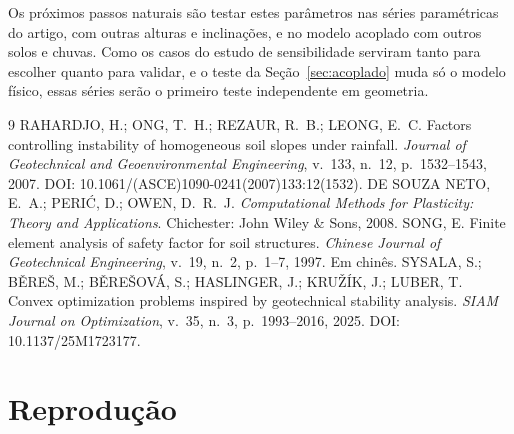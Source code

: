 \documentclass[11pt,a4paper]{article}
\numberwithin{equation}{section}
\begin{document}
Os próximos passos naturais são testar estes parâmetros nas séries paramétricas do artigo, com outras alturas e inclinações, e no modelo acoplado com outros solos e chuvas. Como os casos do estudo de sensibilidade serviram tanto para escolher quanto para validar, e o teste da Seção~\ref{sec:acoplado} muda só o modelo físico, essas séries serão o primeiro teste independente em geometria.


\begin{thebibliography}{9}
 RAHARDJO, H.; ONG, T.~H.; REZAUR, R.~B.; LEONG, E.~C. Factors controlling instability of homogeneous soil slopes under rainfall. \emph{Journal of Geotechnical and Geoenvironmental Engineering}, v.~133, n.~12, p.~1532--1543, 2007. DOI: 10.1061/(ASCE)1090-0241(2007)133:12(1532).
 DE SOUZA NETO, E.~A.; PERI\'C, D.; OWEN, D.~R.~J. \emph{Computational Methods for Plasticity: Theory and Applications}. Chichester: John Wiley \& Sons, 2008.
 SONG, E. Finite element analysis of safety factor for soil structures. \emph{Chinese Journal of Geotechnical Engineering}, v.~19, n.~2, p.~1--7, 1997. Em chinês.
 SYSALA, S.; B\v{E}RE\v{S}, M.; B\v{E}RE\v{S}OV\'A, S.; HASLINGER, J.; KRU\v{Z}\'IK, J.; LUBER, T. Convex optimization problems inspired by geotechnical stability analysis. \emph{SIAM Journal on Optimization}, v.~35, n.~3, p.~1993--2016, 2025. DOI: 10.1137/25M1723177.
\end{thebibliography}


\appendix

\section{Reprodução}\label{ap:reproducao}
\end{document}

